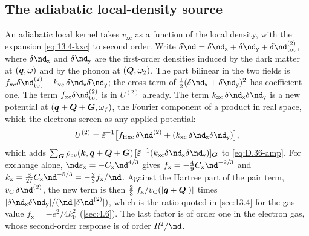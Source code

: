 \subsection*{The adiabatic local-density source}

An adiabatic local kernel takes $v_{\mathrm{xc}}$ as a function of the local density, with the expansion \cref{eq:13.4-kxc} to second order. Write $\delta\nd = \delta\nd_{\mathsf{x}} + \delta\nd_{\mathsf{y}} + \delta\nd^{(2)}_{\mathrm{tot}}$, where $\delta\nd_{\mathsf{x}}$ and $\delta\nd_{\mathsf{y}}$ are the first-order densities induced by the dark matter at $(\bm{q},\omega)$ and by the phonon at $(\bm{Q},\omega_2)$. The part bilinear in the two fields is $f_{\mathrm{xc}}\delta\nd^{(2)}_{\mathrm{tot}} + k_{\mathrm{xc}}\,\delta\nd_{\mathsf{x}}\delta\nd_{\mathsf{y}}$; the cross term of $\frac12(\delta\nd_{\mathsf{x}} + \delta\nd_{\mathsf{y}})^2$ has coefficient one. The term $f_{\mathrm{xc}}\delta\nd^{(2)}_{\mathrm{tot}}$ is in $U^{(2)}$ already. The term $k_{\mathrm{xc}}\,\delta\nd_{\mathsf{x}}\delta\nd_{\mathsf{y}}$ is a new potential at $(\bm{q}+\bm{Q}+\bm{G},\omega_f)$, the Fourier component of a product in real space, which the electrons screen as any applied potential:
\begin{equation*}
  U^{(2)} = \tilde\varepsilon^{-1}\bigl[f_{\mathrm{Hxc}}\,\delta\nd^{(2)} + (k_{\mathrm{xc}}\,\delta\nd_{\mathsf{x}}\delta\nd_{\mathsf{y}})\bigr] ,
\end{equation*}
which adds $\sum_{\vect{G}}\rho_{cv}(\vect{k},\vect{q}+\vect{Q}+\vect{G})\,[\tilde\varepsilon^{-1}(k_{\mathrm{xc}}\delta\nd_{\mathsf{x}}\delta\nd_{\mathsf{y}})]_{\vect{G}}$ to \cref{eq:D.36-amp}. For exchange alone, $\nd\varepsilon_{\mathrm{x}} = -C_{\mathrm{x}}\nd^{4/3}$ gives $f_{\mathrm{x}} = -\frac49C_{\mathrm{x}}\nd^{-2/3}$ and $k_{\mathrm{x}} = \frac{8}{27}C_{\mathrm{x}}\nd^{-5/3} = -\frac23 f_{\mathrm{x}}/\nd$. Against the Hartree part of the pair term, $v_{\mathrm{C}}\,\delta\nd^{(2)}$, the new term is then $\frac23|f_{\mathrm{x}}/v_{\mathrm{C}}(|\bm{q}+\bm{Q}|)|$ times $|\delta\nd_{\mathsf{x}}\delta\nd_{\mathsf{y}}|/(\nd\,|\delta\nd^{(2)}|)$, which is the ratio quoted in \cref{sec:13.4} for the gas value $f_{\mathrm{x}} = -e^2/4k_{\mathrm{F}}^2$ (\cref{sec:4.6}). The last factor is of order one in the electron gas, whose second-order response is of order $R^2/\nd$.
